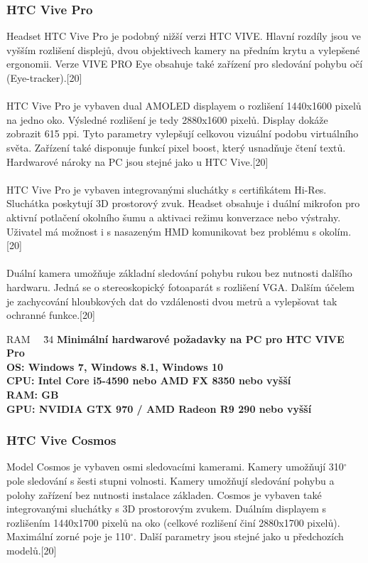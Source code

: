\documentclass[a4paper, 12pt]{report}
\begin{document}
\subsubsection{HTC Vive Pro} Headset HTC Vive Pro je podobný nižší verzi HTC VIVE. Hlavní rozdíly jsou ve vyšším rozlišení displejů, dvou objektivech kamery na předním krytu a vylepšené ergonomii. Verze VIVE PRO Eye obsahuje také zařízení pro sledování pohybu očí (Eye-tracker).[20]\\
\\
HTC Vive Pro je vybaven dual AMOLED displayem o rozlišení 1440x1600 pixelů na jedno oko. Výsledné rozlišení je tedy 2880x1600 pixelů. Display dokáže zobrazit 615 ppi. Tyto parametry vylepšují celkovou vizuální podobu virtuálního světa. Zařízení také disponuje funkcí pixel boost, který usnadňuje čtení textů. Hardwarové nároky na PC jsou stejné jako u HTC Vive.[20]\\
\\
HTC Vive Pro je vybaven integrovanými sluchátky s certifikátem Hi-Res. Sluchátka poskytují 3D prostorový zvuk. Headset obsahuje i duální mikrofon pro aktivní potlačení okolního šumu a aktivaci režimu konverzace nebo výstrahy. Uživatel má možnost i s nasazeným HMD komunikovat bez problému s okolím.[20]\\
\\
Duální kamera umožňuje základní sledování pohybu rukou bez nutnosti dalšího hardwaru. Jedná se o stereoskopický fotoaparát s rozlišení VGA. Dalším účelem je zachycování hloubkových dat do vzdálenosti dvou metrů a vylepšovat tak ochranné funkce.[20]

\begin{tabbing}
    RAM ~~\= 
    \= 34 \kill
    \bfseries Minimální hardwarové požadavky na PC pro HTC VIVE Pro \> \\[1mm]
    OS: \> Windows 7, Windows 8.1, Windows 10\\
    CPU: \> Intel Core i5-4590 nebo AMD FX 8350 nebo vyšší\\
    RAM:  GB\\
    GPU: \> NVIDIA GTX 970 / AMD Radeon R9 290 nebo vyšší\\
    \end{tabbing}

\subsubsection{HTC Vive Cosmos} Model Cosmos je vybaven osmi sledovacími kamerami. Kamery umožňují 310$^\circ$ pole sledování s šesti stupni volnosti. Kamery umožňují sledování pohybu a polohy zařízení bez nutnosti instalace základen. Cosmos je vybaven také integrovanými sluchátky s 3D prostorovým zvukem. Duálním displayem s rozlišením 1440x1700 pixelů na oko (celkové rozlišení činí 2880x1700 pixelů). Maximální zorné poje je 110$^\circ$. Další parametry jsou stejné jako u předchozích modelů.[20]
\end{document}
